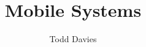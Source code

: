 \newcommand{\coursename}{Mobile Systems}
\newcommand{\coursecode}{28512}
\newcommand{\courseinfo}{}
\newcommand{\Author}{Todd Davies} 
\newcommand{\Title}{Mobile Systems}
\author{\Author}
\title{\Title}
